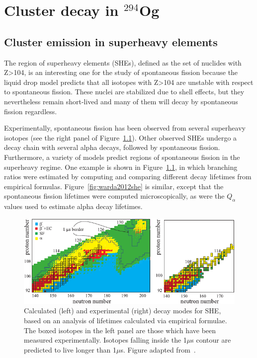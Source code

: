 \chapter{Cluster decay in $^{294}$Og}\label{chap:294Og}

\section{Cluster emission in superheavy elements}

The region of superheavy elements (SHEs), defined as the set of nuclides with Z>104, is an interesting one for the study of spontaneous fission because the liquid drop model predicts that all isotopes with Z>104 are unstable with respect to spontaneous fission. These nuclei are stabilized due to shell effects, but they nevertheless remain short-lived and many of them will decay by spontaneous fission regardless.

Experimentally, spontaneous fission has been observed from several superheavy isotopes (see the right panel of Figure~\ref{fig:karpovshedecay}). Other observed SHEs undergo a decay chain with several alpha decays, followed by spontaneous fission. Furthermore, a variety of models predict regions of spontaneous fission in the superheavy regime. One example is shown in Figure~\ref{fig:karpovshedecay}, in which branching ratios were estimated by computing and comparing different decay lifetimes from empirical formulas. Figure~\ref{fig:warda2012she} is similar, except that the spontaneous fission lifetimes were computed microscopically, as were the $Q_\alpha$ values used to estimate alpha decay lifetimes.


\begin{figure}
	\centering
	\includegraphics[width=0.9\linewidth]{TeX_files/294Og_Karpov_SHEdecay}
	\caption[Calculated and experimental decay modes for SHE]{Calculated (left) and experimental (right) decay modes for SHE, based on an analysis of lifetimes calculated via empirical formulae. The boxed isotopes in the left panel are those which have been measured experimentally. Isotopes falling inside the 1$\mu$s contour are predicted to live longer than 1$\mu$s. Figure adapted from~\cite{Karpova}.}
	\label{fig:karpovshedecay}
\end{figure}


